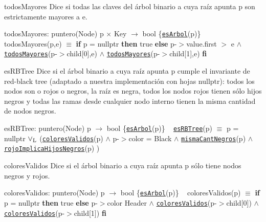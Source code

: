 \begin{DoxyParagraph}{todos\+Mayores}
Dice si todas las claves del árbol binario a cuya raíz apunta p son estrictamente mayores a e.

todos\+Mayores\+: puntero(\+Node) p $\times$ Key $\to$ bool \{\href{axiomas.html#esArbol}{\tt es\+Arbol}(p)\} ~\newline
 todos\+Mayores(p,e) $\equiv$ {\bfseries if} p = nullptr {\bfseries then} true {\bfseries else} p-\/$>$value.\+first $>$ e $\land$ \href{axiomas.html#todosMayores}{\tt todos\+Mayores}(p-\/$>$child\mbox{[}0\mbox{]},e) $\land$ \href{axiomas.html#todosMayores}{\tt todos\+Mayores}(p-\/$>$child\mbox{[}1\mbox{]},e) {\bfseries fi} 


\end{DoxyParagraph}
\begin{DoxyParagraph}{es\+R\+B\+Tree}
Dice si el árbol binario a cuya raíz apunta p cumple el invariante de red-\/black tree (adaptado a nuestra implementación con hojas nullptr)\+: todos los nodos son o rojos o negros, la raíz es negra, todos los nodos rojos tienen sólo hijos negros y todas las ramas desde cualquier nodo interno tienen la misma cantidad de nodos negros.

es\+R\+B\+Tree\+: puntero(\+Node) p $\to$ bool \{\href{axiomas.html#esArbol}{\tt es\+Arbol}(p)\} ~\newline
 \href{axiomas.html#esRBTree}{\tt es\+R\+B\+Tree}(p) $\equiv$ p = nullptr $\lor_{\rm L}$ (\href{axiomas.html#coloresValidos}{\tt colores\+Validos}(p) $\land$ p-\/$>$color = Black $\land$ \href{axiomas.html#mismaCantNegros}{\tt misma\+Cant\+Negros}(p) $\land$ \href{axiomas.html#rojoImplicaHijosNegros}{\tt rojo\+Implica\+Hijos\+Negros}(p) )


\end{DoxyParagraph}
\begin{DoxyParagraph}{colores\+Validos}
Dice si el árbol binario a cuya raíz apunta p sólo tiene nodos negros y rojos.

colores\+Validos\+: puntero(\+Node) p $\to$ bool \{\href{axiomas.html#esArbol}{\tt es\+Arbol}(p)\} ~\newline
 colores\+Validos(p) $\equiv$ {\bfseries if} p = nullptr {\bfseries then} true {\bfseries else} p-\/$>$color  Header $\land$ \href{axiomas.html#coloresValidos}{\tt colores\+Validos}(p-\/$>$child\mbox{[}0\mbox{]}) $\land$ \href{axiomas.html#coloresValidos}{\tt colores\+Validos}(p-\/$>$child\mbox{[}1\mbox{]}) {\bfseries fi} 


\end{DoxyParagraph}
